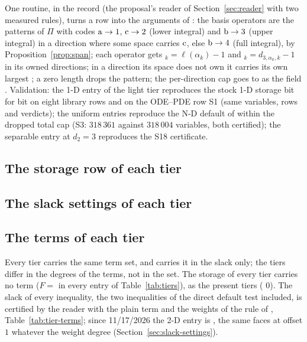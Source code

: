 One routine,  in the record (the proposal's reader of Section~\ref{sec:reader} with two measured rules), turns a row into the arguments of : the basis operators are the patterns of $\Pi$ with codes $\mathrm{a}\to1$, $\mathrm{c}\to2$ (lower integral) and $\mathrm{b}\to3$ (upper integral) in a direction where some space carries $\mathrm{c}$, else $\mathrm{b}\to4$ (full integral), by Proposition~\ref{prop:span}; each operator gets $_k=\ell(\alpha_k)-1$ and $_k=d_{3,\alpha_k,k}-1$ in its owned directions; in a direction its space does not own it carries its own largest ; a zero length drops the pattern; the per-direction cap goes to  as the field . Validation: the 1-D entry of the light tier reproduces the stock 1-D storage bit for bit on eight library rows and on the ODE--PDE row S1 (same variables, rows and verdicts); the uniform entries reproduce the N-D default of  within the dropped total cap (S3: $318\,361$ against $318\,004$ variables, both certified); the separable entry at $d_2=3$ reproduces the S18 certificate.

\subsection{The storage row of each tier}\label{sec:tiers-values}



\subsection{The slack settings of each tier}\label{sec:knobs-slack}



\subsection{The terms of each tier}\label{sec:tier-terms}

Every tier carries the same term set, and carries it in the slack only; the tiers differ in the degrees of the terms, not in the set. The storage of every tier carries no term ($F=$  in every entry of Table~\ref{tab:tiers}), as the present tiers ( $0$). The slack of every inequality, the two inequalities of the direct default test included, is certified by the reader with the plain term and the weights of the rule  of , Table~\ref{tab:tier-terms}; since 11/17/2026 the 2-D entry is , the same faces at offset $1$ whatever the weight degree (Section~\ref{sec:slack-settings}).

